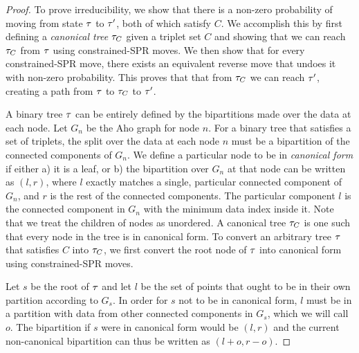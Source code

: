 \irreducible*
\begin{proof}
To prove irreducibility, we show that there is a non-zero probability
of moving from state $\tau$ to $\tau'$, both of which satisfy $C$. We
accomplish this by first defining a \emph{canonical tree} $\tau_C$ given a triplet 
set $C$ and showing that we can reach $\tau_C$ from $\tau$ using  
constrained-SPR moves. We then show that for every constrained-SPR move,
there exists an equivalent reverse move that undoes it with non-zero
probability.
This proves that that from $\tau_C$ we can reach $\tau'$, 
creating a path from $\tau$ to $\tau_C$ to $\tau'$.

A binary tree $\tau$ can be entirely defined by the bipartitions
made over the data at each node. 
Let $G_n$ be the Aho graph for node $n$.
For a binary tree that satisfies a set of triplets, 
the split over the data at each node $n$ must 
be a bipartition of the connected components of $G_n$.
We define a particular node to be in \emph{canonical form}
if either a) it is a leaf, or b) the bipartition over $G_n$
at that node can be written as
$(l, r)$, where $l$ exactly matches a single, particular connected component of
$G_n$, and $r$ is the rest of the connected components. 
The particular component
$l$ is the connected component in $G_n$ with the minimum data index
inside it.
Note that we treat the children of nodes as unordered.
A canonical tree $\tau_C$ is one such that every node in the tree is
in canonical form.
To convert an arbitrary tree $\tau$ that satisfies $C$ into $\tau_C$, we first
convert the root node of $\tau$ into canonical form
using constrained-SPR moves.

Let $s$ be the root of $\tau$ and let $l$
be the set of points that ought to be in their own partition according
to $G_s$. In order for
$s$ not to be in canonical form, $l$ must be in a partition with 
data from other connected components in $G_s$, which we will call $o$.
The bipartition if $s$ were in canonical form would be $(l, r)$ and
the current non-canonical bipartition can thus be written as $(l + o, r - o)$.


\end{proof}
